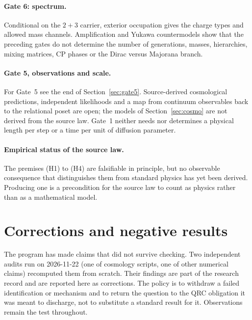 \documentclass[11pt]{article}
\theoremstyle{definition}
\theoremstyle{remark}
\begin{document}
\paragraph{Gate 6: spectrum.} Conditional on the $2+3$ carrier, exterior occupation
gives the charge types and allowed mass channels. Amplification and Yukawa countermodels
show that the preceding gates do not determine the number of generations, masses,
hierarchies, mixing matrices, CP phases or the Dirac versus Majorana branch.

\paragraph{Gate 5, observations and scale.} For Gate~5 see the end of
Section~\ref{sec:gate5}. Source-derived cosmological predictions, independent likelihoods
and a map from continuum observables back to the relational poset are open; the models of
Section~\ref{sec:cosmo} are not derived from the source law. Gate~1 neither needs nor
determines a physical length per step or a time per unit of diffusion parameter.

\paragraph{Empirical status of the source law.} The premises (H1) to (H4) are
falsifiable in principle, but no observable consequence that distinguishes them from
standard physics has yet been derived. Producing one is a precondition for the source
law to count as physics rather than as a mathematical model.

\section{Corrections and negative results}
\label{sec:corrections}

The program has made claims that did not survive checking. Two independent audits run on
2026-11-22 (one of cosmology scripts, one of other numerical claims) recomputed them
from scratch. Their findings are part of the research record and are reported here as
corrections. The policy is to withdraw a failed identification or mechanism and to
return the question to the QRC obligation it was meant to discharge, not to substitute a
standard result for it. Observations remain the test throughout.
\end{document}
